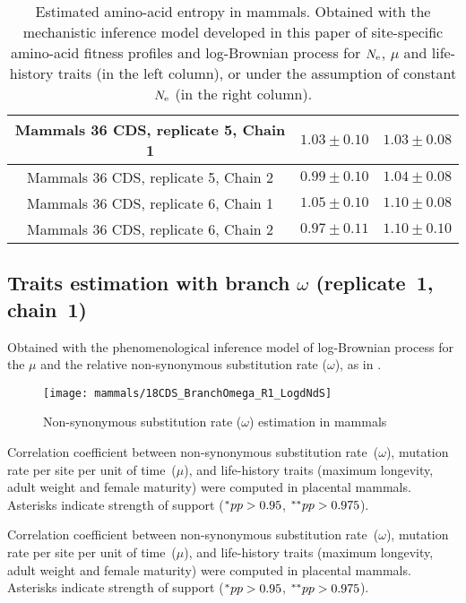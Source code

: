 \begin{table}[H]
{\begin{tabu}{|c|c|c|}
        Mammals 36 \acrshort{CDS}, replicate 5, Chain 1 & $1.03 \pm 0.10$ & $1.03 \pm 0.08$\\ \hline
        Mammals 36 \acrshort{CDS}, replicate 5, Chain 2 & $0.99 \pm 0.10$ & $1.04 \pm 0.08$\\ \hline
        Mammals 36 \acrshort{CDS}, replicate 6, Chain 1 & $1.05 \pm 0.10$ & $1.10 \pm 0.08$\\ \hline
        Mammals 36 \acrshort{CDS}, replicate 6, Chain 2 & $0.97 \pm 0.11$ & $1.10 \pm 0.10$\\ \hline
    \end{tabu}}
    \caption[Entropy of amino acids in mammals]{Estimated amino-acid entropy in mammals.
    Obtained with the mechanistic inference model developed in this paper of site-specific amino-acid fitness profiles and log-Brownian process for $N_{\text{e}}$, $\mu$ and life-history traits (in the left column), or under the assumption of constant $N_{\text{e}}$ (in the right column).}
    \label{tab:table-entropy-aa-mutselne}
\end{table}

\subsection{Traits estimation with branch \texorpdfstring{$\omega$}{ω} (replicate~1, chain~1)}
Obtained with the phenomenological inference model of log-Brownian process for the $\mu$ and the relative non-synonymous substitution rate ($\omega$), as in \citet{Lartillot2011}.

\begin{figure}[H]
    \centering
    \texttt{[image: mammals/18CDS\_BranchOmega\_R1\_LogdNdS]}
    \caption[$\omega$ estimation in mammals]{{Non-synonymous substitution} rate ($\omega$) estimation in mammals}
\end{figure}

\begin{table}[H]
    
    \caption[Correlation coefficient matrix in mammals ($\omega$)]{
    Correlation coefficient between non-synonymous substitution rate~($\omega$), mutation rate per site per unit of time~($\mu$), and life-history traits (maximum longevity, adult weight and female maturity) were computed in placental mammals.
    Asterisks indicate strength of support ($\smash{^{*}} pp > 0.95$, $\smash{^{**}} pp > 0.975$).}
\end{table}

\begin{table}[H]
    
    \caption[Covariance matrix in mammals ($\omega$)]{
    Correlation coefficient between non-synonymous substitution rate~($\omega$), mutation rate per site per unit of time~($\mu$), and life-history traits (maximum longevity, adult weight and female maturity) were computed in placental mammals.
    Asterisks indicate strength of support ($\smash{^{*}} pp > 0.95$, $\smash{^{**}} pp > 0.975$).}
\end{table}

